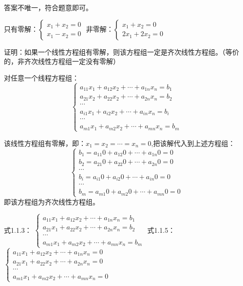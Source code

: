 \documentclass[a4paper]{report}
\begin{document}
\begin{jie}
答案不唯一，符合题意即可。

只有零解：$
\begin{cases}
x_1+x_2 = 0\\
x_1-x_2 = 0
\end{cases}$\hphantom{~~~~~~~~~~}
非零解：$
\begin{cases}
x_1+x_2 = 0\\
2x_1+2x_2 = 0
\end{cases}$
\end{jie}

\EX 证明：如果一个线性方程组有零解，则该方程组一定是齐次线性方程组。（等价的，非齐次线性方程组一定没有零解）

\begin{zhengming}
对任意一个线程方程组：
\begin{equation*}\begin{cases}
a_{11}x_{1}+a_{12}x_{2}+\cdots+a_{1n}x_{n}=b_1\\
a_{21}x_{2}+a_{22}x_{2}+\cdots+a_{2n}x_{n}=b_2\\
\cdots\\
a_{i1}x_{1}+a_{i2}x_{2}+\cdots+a_{in}x_{n}=b_i\\
\cdots\\
a_{m1}x_{1}+a_{m2}x_{2}+\cdots+a_{mn}x_{n}=b_m \end{cases}
\end{equation*}

该线性方程组有零解，即：$x_1=x_2=\cdots=x_n=0$,把该解代入到上述方程组：
\begin{equation*}\begin{cases}
b_1=a_{11}0+a_{12}0+\cdots+a_{1n}0=0\\
b_2=a_{21}0+a_{22}0+\cdots+a_{2n}0=0\\
\cdots\\
b_i=a_{i1}0+a_{i2}0+\cdots+a_{in}0=0\\
\cdots\\
b_m=a_{m1}0+a_{m2}0+\cdots+a_{mn}0=0 \end{cases}
\end{equation*}
即该方程组为齐次线性方程组。
\end{zhengming}

式1.1.3：
$
\begin{cases}
a_{11}x_{1}+a_{12}x_{2}+\cdots+a_{1n}x_{n}=b_1\\
a_{21}x_{1}+a_{22}x_{2}+\cdots+a_{2n}x_{n}=b_2\\
\cdots\\
a_{m1}x_{1}+a_{m2}x_{2}+\cdots+a_{mn}x_{n}=b_m \end{cases}
$
式1.1.5：
$
\begin{cases}
a_{11}x_{1}+a_{12}x_{2}+\cdots+a_{1n}x_{n}=0\\
a_{21}x_{1}+a_{22}x_{2}+\cdots+a_{2n}x_{n}=0\\
\cdots\\
a_{m1}x_{1}+a_{m2}x_{2}+\cdots+a_{mn}x_{n}=0 \end{cases}
$
\end{document}
